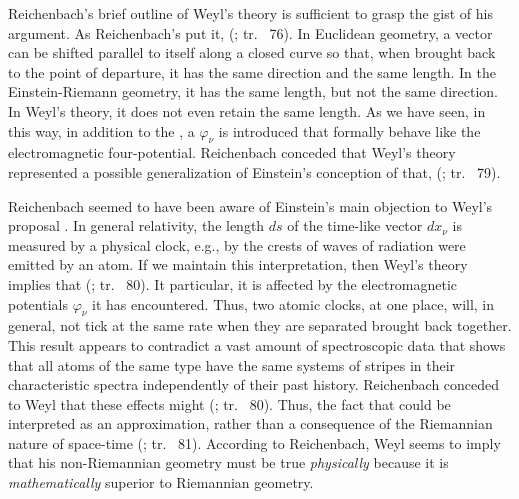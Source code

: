 \documentclass[final]{article}
\newcommand{\phin}{\ensuremath{\varphi_\nu}\xspace}
\newcommand{\WT}{Weyl's theory\xspace}
\newcommand{\rhp}[2]{(\cite[#1]{Reichenbach1920a}; tr.\ \citeyear{Reichenbach1969} #2)\xspace}
\begin{document}
Reichenbach's brief outline of \WT is sufficient to grasp the gist of his argument. As Reichenbach's put it,  \rhp{73}{76}. In Euclidean geometry, a vector can be shifted parallel to itself along a closed curve so that, when brought back to the point of departure, it has the same direction and the same length. In the Einstein-Riemann geometry, it has the same length, but not the same direction. In \WT, it does not even retain the same length. As we have seen, in this way, in addition to the  \gmn, a  $\phin$ is introduced that formally behave like the electromagnetic four-potential. Reichenbach conceded that \WT represented a possible generalization of Einstein's conception of \spti that,  \rhp{76}{79}. 

Reichenbach seemed to have been aware of Einstein's main objection to Weyl's proposal \citep[see][]{Einstein1918b}. In general relativity, the length $ds$ of the time-like vector $dx_\nu$ is measured by a physical clock, e.g., by the crests of waves of radiation were emitted by an atom. If we maintain this interpretation, then \WT implies that  \rhp{77}{80}. It particular, it is affected by the electromagnetic potentials $\varphi_\nu$ it has encountered. Thus, two atomic clocks, at one place, will, in general, not tick at the same rate when they are separated brought back together. This result appears to contradict a vast amount of spectroscopic data that shows that all atoms of the same type have the same systems of stripes in their characteristic spectra independently of their past history. Reichenbach conceded to Weyl that these effects might  \rhp{77}{80}. Thus, the fact that  could be interpreted as an approximation, rather than a consequence of the Riemannian nature of space-time \rhp{77}{81}. According to Reichenbach, Weyl seems to imply that his non-Riemannian geometry must be true \emph{physically} because it is \emph{mathematically} superior to Riemannian geometry.
\end{document}
